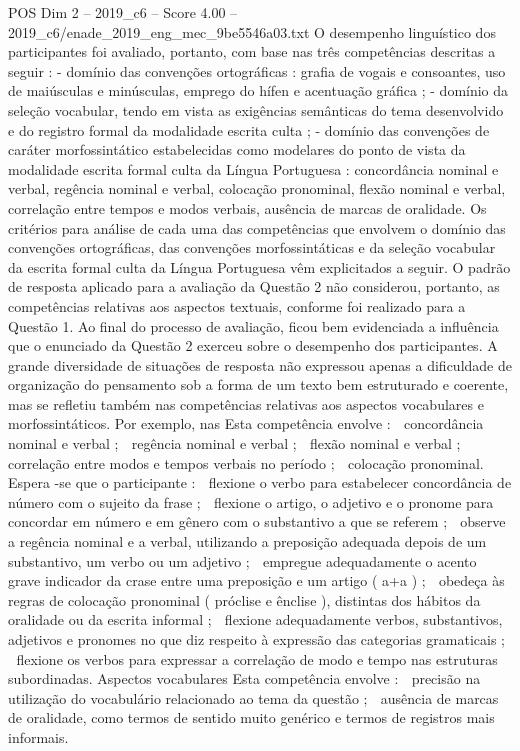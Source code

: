 \begin{textsample}{POS Dim 2 – 2019\_c6 – Score 4.00 – 2019\_c6/enade\_2019\_eng\_mec\_9be5546a03.txt}
O desempenho linguístico dos participantes foi avaliado, portanto, com base nas três competências descritas a seguir : - domínio das convenções ortográficas : grafia de vogais e consoantes, uso de maiúsculas e minúsculas, emprego do hífen e acentuação gráfica ; - domínio da seleção vocabular, tendo em vista as exigências semânticas do tema desenvolvido e do registro formal da modalidade escrita culta ; - domínio das convenções de caráter morfossintático estabelecidas como modelares do ponto de vista da modalidade escrita formal culta da Língua Portuguesa : concordância nominal e verbal, regência nominal e verbal, colocação pronominal, flexão nominal e verbal, correlação entre tempos e modos verbais, ausência de marcas de oralidade.
Os critérios para análise de cada uma das competências que envolvem o domínio das convenções ortográficas, das convenções morfossintáticas e da seleção vocabular da escrita formal culta da Língua Portuguesa vêm explicitados a seguir.
O padrão de resposta aplicado para a avaliação da Questão 2 não considerou, portanto, as competências relativas aos aspectos textuais, conforme foi realizado para a Questão 1.
Ao final do processo de avaliação, ficou bem evidenciada a influência que o enunciado da Questão 2 exerceu sobre o desempenho dos participantes.
A grande diversidade de situações de resposta não expressou apenas a dificuldade de organização do pensamento sob a forma de um texto bem estruturado e coerente, mas se refletiu também nas competências relativas aos aspectos vocabulares e morfossintáticos.
Por exemplo, nas Esta competência envolve :  concordância nominal e verbal ;  regência nominal e verbal ;  flexão nominal e verbal ;  correlação entre modos e tempos verbais no período ;  colocação pronominal.
Espera -se que o participante :  flexione o verbo para estabelecer concordância de número com o sujeito da frase ;  flexione o artigo, o adjetivo e o pronome para concordar em número e em gênero com o substantivo a que se referem ;  observe a regência nominal e a verbal, utilizando a preposição adequada depois de um substantivo, um verbo ou um adjetivo ;  empregue adequadamente o acento grave indicador da crase entre uma preposição e um artigo ( a+a ) ;  obedeça às regras de colocação pronominal ( próclise e ênclise ), distintas dos hábitos da oralidade ou da escrita informal ;  flexione adequadamente verbos, substantivos, adjetivos e pronomes no que diz respeito à expressão das categorias gramaticais ;  flexione os verbos para expressar a correlação de modo e tempo nas estruturas subordinadas.
Aspectos vocabulares Esta competência envolve :  precisão na utilização do vocabulário relacionado ao tema da questão ;  ausência de marcas de oralidade, como termos de sentido muito genérico e termos de registros mais informais.

\end{textsample}

